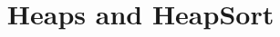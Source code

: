 \documentclass[a4paper,10pt]{article}
\begin{document}
\title{Heaps and HeapSort}
\maketitle
\end{document}

